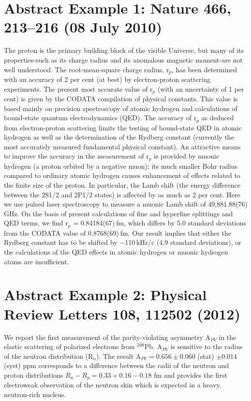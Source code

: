 \documentclass{article}
\begin{document}
\section{Abstract Example 1: Nature 466, 213–216 (08 July 2010)}

The proton is the primary building block of the visible Universe, but many of its properties-such as its charge radius and its anomalous magnetic moment-are not well understood. The root-mean-square charge radius, r$_p$, has been determined with an accuracy of 2 per cent (at best) by electron-proton scattering experiments. The present most accurate value of r$_p$ (with an uncertainty of 1 per cent) is given by the CODATA compilation of physical constants. This value is based mainly on precision spectroscopy of atomic hydrogen and calculations of bound-state quantum electrodynamics (QED). The accuracy of r$_p$ as deduced from electron-proton scattering limits the testing of bound-state QED in atomic hydrogen as well as the determination of the Rydberg constant (currently the most accurately measured fundamental physical constant). An attractive means to improve the accuracy in the measurement of r$_p$ is provided by muonic hydrogen (a proton orbited by a negative muon); its much smaller Bohr radius compared to ordinary atomic hydrogen causes enhancement of effects related to the finite size of the proton. In particular, the Lamb shift (the energy difference between the 2S1/2 and 2P1/2 states) is affected by as much as 2 per cent. Here we use pulsed laser spectroscopy to measure a muonic Lamb shift of 49,881.88(76) GHz. On the basis of present calculations of fine and hyperfine splittings and QED terms, we find r$_p$ = 0.84184(67) fm, which differs by 5.0 standard deviations from the CODATA value of 0.8768(69) fm. Our result implies that either the Rydberg constant has to be shifted by −110 kHz/c (4.9 standard deviations), or the calculations of the QED effects in atomic hydrogen or muonic hydrogen atoms are insufficient.

\section{Abstract Example 2: Physical Review Letters 108, 112502 (2012)}

We report the first measurement of the parity-violating asymmetry A$_{PV}$ in the elastic scattering of polarized electrons from $^{208}$Pb. A$_{PV}$ is sensitive to the radius of the neutron distribution (R$_n$). The result A$_{PV} = 0.656 \pm 0.060$ (stat) $\pm 0.014 $(syst) ppm corresponds to a difference between the radii of the neutron and proton distributions $R_n - R_p = 0.33 +0.16 -0.18$ fm and provides the first electroweak observation of the neutron skin which is expected in a heavy, neutron-rich nucleus.
\end{document}
